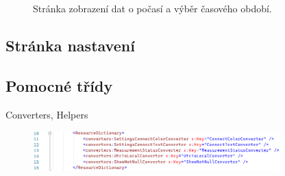 \begin{figure}[hbt]
\centering
{}
\caption{Stránka zobrazení dat o počasí a výběr časového období.}
\end{figure}


\subsection{Stránka nastavení}


\subsection{Pomocné třídy}
Converters, Helpers

\begin{figure}[hbt]
\includegraphics[width=0.85\textwidth]{obrazky-figures/code-maui-converters0.png}
\caption{}
\end{figure}

